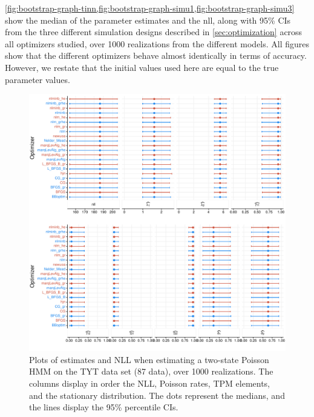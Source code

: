 \documentclass[]{interact}\usepackage[]{graphicx}\usepackage[dvipsnames]{xcolor}
\makeatletter
\def\maxwidth{ %
  \ifdim\Gin@nat@width>\linewidth
    \linewidth
  \else
    \Gin@nat@width
  \fi
}
\newenvironment{knitrout}{}{} %
\theoremstyle{plain}%
\theoremstyle{definition}
\theoremstyle{remark}
\makeatother
\begin{document}

\cref{fig:bootstrap-graph-tinn,fig:bootstrap-graph-simu1,fig:bootstrap-graph-simu3} show the median of the parameter estimates and the nll, along with 95\% CIs from the three different simulation designs described in \autoref{sec:optimization} across all optimizers studied, over 1000 realizations from the different models. All figures show that the different optimizers behave almost identically in terms of accuracy. However, we restate that the initial values used here are equal to the true parameter values.   




\begin{knitrout}
\color{fgcolor}\begin{figure}[htb]

{\centering \includegraphics[width=\maxwidth]{figure/bootstrap-graph-tinn-1} 

}

\caption[Plots of estimates and NLL when estimating a two-state Poisson HMM on the TYT data set (87 data), over 1000 realizations]{Plots of estimates and NLL when estimating a two-state Poisson HMM on the TYT data set (87 data), over 1000 realizations. The columns display in order the NLL, Poisson rates, TPM elements, and the stationary distribution. The dots represent the medians, and the lines display the 95\% percentile CIs.}\label{fig:bootstrap-graph-tinn}
\end{figure}

\end{knitrout}
\end{document}

